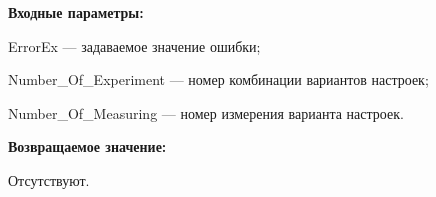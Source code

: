 \textbf{Входные параметры:}

ErrorEx --- задаваемое значение ошибки;
 
    Number\_Of\_Experiment --- номер комбинации вариантов настроек;
 
    Number\_Of\_Measuring --- номер измерения варианта настроек.

\textbf{Возвращаемое значение:}

Отсутствуют.
